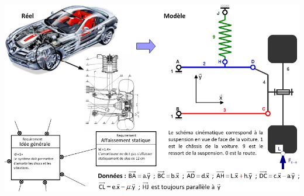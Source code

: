 \documentclass[10pt,fleqn]{article} %
\begin{document}
\begin{center}
\includegraphics[width=.9\linewidth]{images/suspension}
\end{center}
\end{document}
